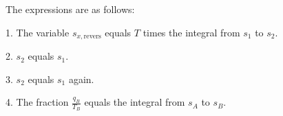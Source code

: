 The expressions are as follows:

1. The variable \( s_{x, \text{revers}} \) equals \( T \) times the integral from \( s_1 \) to \( s_2 \).

2. \( s_2 \) equals \( s_1 \).

3. \( s_2 \) equals \( s_1 \) again.

4. The fraction \( \frac{q_B}{T_B} \) equals the integral from \( s_A \) to \( s_B \).